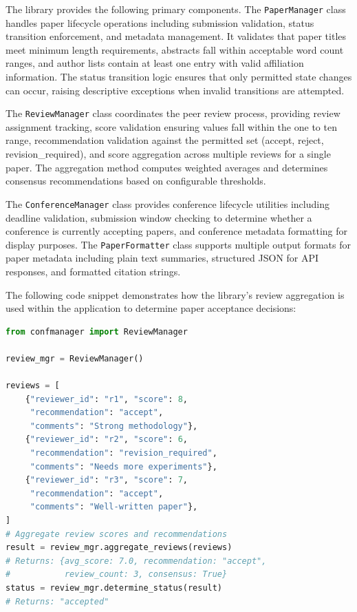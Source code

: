 \documentclass[conference]{IEEEtran}
\begin{document}
The library provides the following primary components. The \texttt{PaperManager} class handles paper lifecycle operations including submission validation, status transition enforcement, and metadata management. It validates that paper titles meet minimum length requirements, abstracts fall within acceptable word count ranges, and author lists contain at least one entry with valid affiliation information. The status transition logic ensures that only permitted state changes can occur, raising descriptive exceptions when invalid transitions are attempted.

The \texttt{ReviewManager} class coordinates the peer review process, providing review assignment tracking, score validation ensuring values fall within the one to ten range, recommendation validation against the permitted set (accept, reject, revision\_required), and score aggregation across multiple reviews for a single paper. The aggregation method computes weighted averages and determines consensus recommendations based on configurable thresholds.

The \texttt{ConferenceManager} class provides conference lifecycle utilities including deadline validation, submission window checking to determine whether a conference is currently accepting papers, and conference metadata formatting for display purposes. The \texttt{PaperFormatter} class supports multiple output formats for paper metadata including plain text summaries, structured JSON for API responses, and formatted citation strings.

The following code snippet demonstrates how the library's review aggregation is used within the application to determine paper acceptance decisions:

\begin{lstlisting}[language=Python, caption={ReviewManager usage for review score aggregation}]
from confmanager import ReviewManager

review_mgr = ReviewManager()

reviews = [
    {"reviewer_id": "r1", "score": 8,
     "recommendation": "accept",
     "comments": "Strong methodology"},
    {"reviewer_id": "r2", "score": 6,
     "recommendation": "revision_required",
     "comments": "Needs more experiments"},
    {"reviewer_id": "r3", "score": 7,
     "recommendation": "accept",
     "comments": "Well-written paper"},
]
# Aggregate review scores and recommendations
result = review_mgr.aggregate_reviews(reviews)
# Returns: {avg_score: 7.0, recommendation: "accept",
#           review_count: 3, consensus: True}
status = review_mgr.determine_status(result)
# Returns: "accepted"
\end{lstlisting}
\end{document}
